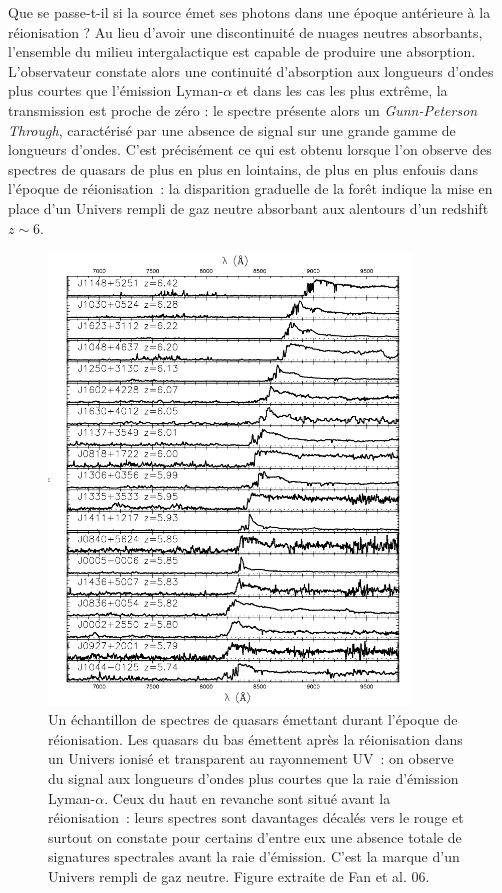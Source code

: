 Que se passe-t-il si la source émet ses photons dans une époque antérieure à la réionisation ? Au lieu d'avoir une discontinuité de nuages neutres absorbants, l'ensemble du milieu intergalactique est capable de produire une absorption. L'observateur constate alors une continuité d'absorption aux longueurs d'ondes plus courtes que l'émission Lyman-$\alpha$ et dans les cas les plus extrême, la transmission est proche de zéro : le spectre présente alors un \textit{Gunn-Peterson Through}, caractérisé par une absence de signal sur une grande gamme de longueurs d'ondes. C'est précisément ce qui est obtenu lorsque l'on observe des spectres de quasars de plus en plus en lointains, de plus en plus enfouis dans l'époque de réionisation~: la disparition graduelle de la forêt indique la mise en place d'un Univers rempli de gaz neutre absorbant aux alentours d'un redshift $z\sim 6$.
\begin{figure}[htbp]
	\centering
		\includegraphics[height=12cm]{figs/fan06.png}
		\caption[Spectres de quasars durant la réionisation]{Un échantillon de spectres de quasars émettant durant l'époque de réionisation. Les quasars du bas émettent après la réionisation dans un Univers ionisé et transparent au rayonnement UV~: on observe du signal aux longueurs d'ondes plus courtes que la raie d'émission Lyman-$\alpha$. Ceux du haut en revanche sont situé avant la réionisation~: leurs spectres sont davantages décalés vers le rouge et surtout on constate pour certains d'entre eux une absence totale de signatures spectrales avant la raie d'émission. C'est la marque d'un Univers rempli de gaz neutre. Figure extraite de Fan et al. 06.}
	\label{f:fan06}
\end{figure}

